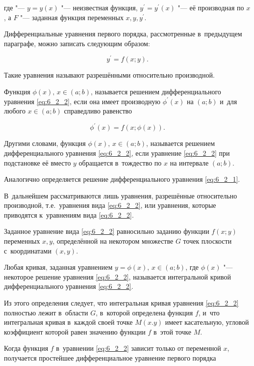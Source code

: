 \noindent
где "--- $y = y(x)$ "--- неизвестная функция, $y^\prime = y^\prime(x)$ "--- её
производная по $x$, а $F$ "--- заданная функция переменных $x, y, y^\prime$.

Дифференциальные уравнения первого порядка, рассмотренные в~предыдущем параграфе,
можно записать следующим образом:

\begin{equation}\label{eq:6_2_2}
y^\prime = f(x; y).
\end{equation}

Такие уравнения называют разрешёнными относительно производной.

Функция $\phi(x), \, x \in (a; b)$, называется решением дифференциального уравнения
\eqref{eq:6_2_2}, если она имеет производную $\phi^\prime(x)$ на $(a; b)$
и~для любого $x \in (a; b)$ справедливо равенство

\begin{equation*}
\phi^\prime (x) = f(x; \phi(x)).
\end{equation*}

Другими словами, функция $\phi(x), \, x \in (a; b)$, называется решением дифференциального
уравнения \eqref{eq:6_2_2}, если уравнение \eqref{eq:6_2_2} при подстановке её вместо
$y$ обращается в~тождество по $x$ на интервале $(a; b)$.

Аналогично определяется решение дифференциального уравнения \eqref{eq:6_2_1}.

В~дальнейшем рассматриваются лишь уравнения, разрешённые относительно производной,
т.е.\ уравнения вида \eqref{eq:6_2_2}, или уравнения, которые приводятся
к~уравнениям вида \eqref{eq:6_2_2}.

Заданное уравнение вида \eqref{eq:6_2_2} равносильно заданию функции $f(x; y)$
переменных $x, y$, определённой на некотором множестве $G$ точек плоскости
с~координатами $(x, y)$.

Любая кривая, заданная уравнением $y = \phi(x), \, x \in (a; b)$,
где $\phi(x)$ "--- некоторое решение уравнения \eqref{eq:6_2_2}, называется
интегральной кривой дифференциального уравнения \eqref{eq:6_2_2}.

Из этого определения следует, что интегральная кривая уравнения \eqref{eq:6_2_2}
полностью лежит в~области $G$, в~которой определена функция $f$,
и~что интегральная кривая в~каждой своей точке $M(x. y)$ имеет касательную,
угловой коэффициент которой равен значению функции $f$ в~этой точке $M$.

Когда функция $f$ в~уравнении \eqref{eq:6_2_2} зависит только от переменной $x$,
получается простейшее дифференциальное уравнение первого порядка

